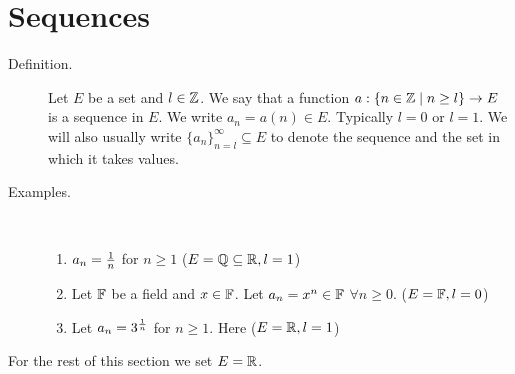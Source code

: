 \documentclass[letterpaper,11pt]{article}
\begin{document}
\section{Sequences}
\begin{description}
\item[Definition.] Let $E$ be a set and $l\in\mathbb{Z}$. We say that a function
    $a:\{n\in\mathbb{Z}\;|\; n\ge l\}\rightarrow E$ is a sequence
    in $E$. We write $a_n=a(n)\in E$. Typically $l=0$ or $l=1$.
    We will also usually write $\{a_n\}^\infty_{n=l}\subseteq E$
    to denote the sequence and the set in which it takes values.

\item[Examples.]\text{}\vspace{-0.2in}\\
  \begin{enumerate}[(1)]
  \item $a_n=\frac{1}{n}$ for $n\ge1$ ($E=\mathbb{Q}\subseteq\mathbb{R}, l=1$)
  \item Let $\mathbb{F}$ be a field and $x\in\mathbb{F}$. Let $a_n=x^n\in\mathbb{F}$
      $\forall n\ge0$. ($E=\mathbb{F},l=0$)
  \item Let $a_n=3^{\frac{1}{n}}$ for $n\ge1$. Here ($E=\mathbb{R}, l=1$)
  \end{enumerate}
\end{description}
For the rest of this section we set $E=\mathbb{R}$.
\end{document}

